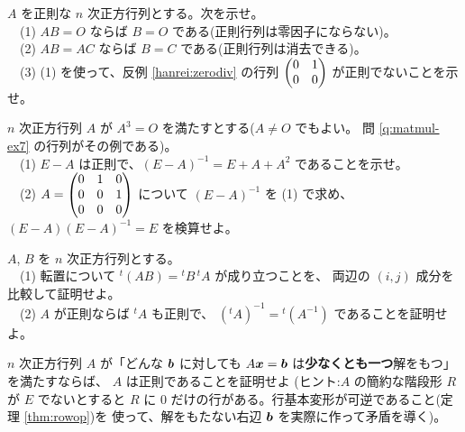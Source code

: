 \begin{mondai}[発展]\label{q:inv-ex9}
$A$ を正則な $n$ 次正方行列とする。次を示せ。\\
　(1) $AB = O$ ならば $B = O$ である(正則行列は零因子にならない)。\\
　(2) $AB = AC$ ならば $B = C$ である(正則行列は消去できる)。\\
　(3) (1) を使って、反例 \ref{hanrei:zerodiv} の行列
$\begin{pmatrix}0 & 1 \\ 0 & 0\end{pmatrix}$ が正則でないことを示せ。
\end{mondai}

\begin{mondai}[発展]\label{q:inv-ex10}
$n$ 次正方行列 $A$ が $A^3 = O$ を満たすとする($A \neq O$ でもよい。
問 \ref{q:matmul-ex7} の行列がその例である)。\\
　(1) $E - A$ は正則で、$(E - A)^{-1} = E + A + A^2$ であることを示せ。\\
　(2) $A = \begin{pmatrix}0 & 1 & 0 \\ 0 & 0 & 1 \\ 0 & 0 & 0\end{pmatrix}$ について
$(E - A)^{-1}$ を (1) で求め、$(E - A)(E - A)^{-1} = E$ を検算せよ。
\end{mondai}

\begin{mondai}[証明]\label{q:inv-ex11}
$A$, $B$ を $n$ 次正方行列とする。\\
　(1) 転置について ${}^t(AB) = {}^t\!B\,{}^t\!A$ が成り立つことを、
両辺の $(i,j)$ 成分を比較して証明せよ。\\
　(2) $A$ が正則ならば ${}^t\!A$ も正則で、
$({}^t\!A)^{-1} = {}^t(A^{-1})$ であることを証明せよ。
\end{mondai}

\begin{mondai}[証明]\label{q:inv-ex12}
$n$ 次正方行列 $A$ が「どんな $\bm{b}$ に対しても
$A\bm{x} = \bm{b}$ は\textbf{少なくとも一つ}解をもつ」を満たすならば、
$A$ は正則であることを証明せよ
(ヒント:$A$ の簡約な階段形 $R$ が $E$ でないとすると $R$ に
$0$ だけの行がある。行基本変形が可逆であること(定理 \ref{thm:rowop})を
使って、解をもたない右辺 $\bm{b}$ を実際に作って矛盾を導く)。
\end{mondai}

